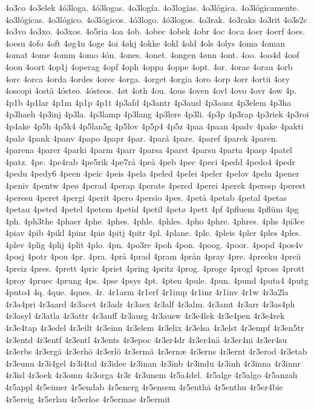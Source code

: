 4o3co
4o3elek
4ó3loga.
4ó3logas.
4o3logía.
4o3logías.
4o3lógica.
4o3lógicamente.
4o3lógicas.
4o3lógico.
4o3lógicos.
4ó3logo.
4ó3logos.
4o3rak.
4o3raks
4o3rit
4o3s2c
4o3vo
4o3xo.
4o3xos.
4o5ria
4oa
4ob.
4obec
4obek
4obr
4oc
4oca
4oer
4oerf
4oes.
4oesu
4ofo
4oft
4øg4u
4oge
4oi
4økj
4okke
4okl
4old
4ols
4olys
4oma
4oman
4omat
4ome
4omm
4omo
4ón.
4ones.
4onet.
4ongen
4ønn
4ont.
4oo.
4oo4d
4oof
4oon
4oort
4op1j
4operag
4opf
4oph
4oppa
4oppe
4opt.
4or.
4orae
4orau
4orb
4orc
4orca
4orda
4ordes
4orec
4orga.
4orget
4orgia
4oro
4orp
4orr
4ortü
4ory
4oscopi
4ostä
4ósteo.
4ósteos.
4øt
4oth
4ou.
4ous
4oven
4ovl
4ovo
4ovr
4ow
4p.
4p1b
4p1lar
4p1m
4p1p
4p1t
4p3afd
4p3antr
4p3ausl
4p3ausz
4p3elem
4p3ha
4p3haeh
4p3inj
4p3la.
4p3lamp
4p3lang
4p3lere
4p3li.
4p3p
4p3rap
4p3riek
4p3roi
4p4ake
4p5h
4p5k4
4p5lan5g
4p5lov
4p5p4
4p5z
4paa
4paan
4padv
4pake
4pakti
4palø
4pank
4panv
4papo
4papr
4par.
4parå
4pare.
4paref
4parek
4paren.
4parena
4parer
4parki
4parm
4parr
4parsa
4parst
4parsu
4parta
4pasp
4patel
4patz.
4pe.
4pe4rab
4pe5rik
4pe7rå
4peå
4peb
4pec
4peci
4pedd
4pedo4
4pedr
4pedu
4pedy6
4peen
4peic
4peis
4pela
4peled
4pelei
4peler
4pelov
4pelu
4pener
4peniv
4pentw
4peø
4perad
4perap
4perate
4pered
4perei
4perek
4peresp
4perest
4peresu
4peret
4pergi
4perit
4pero
4persio
4pes.
4petå
4petab
4petal
4petas
4petau
4peted
4petel
4petem
4petid
4petil
4petø
4pett
4pf
4pfluem
4pflüm
4pg
4ph.
4ph3the
4phaer
4phe.
4phes.
4phle.
4phles.
4pho
4phre.
4phres.
4phs
4pi3ce
4piav
4pib
4pikl
4pinr
4piø
4pitj
4pitr
4pl.
4plane.
4ple.
4pleis
4pler
4ples
4ples.
4plev
4plig
4plij
4plit
4plo.
4pn.
4po3re
4poh
4pon.
4poog.
4poor.
4popd
4pos4v
4posj
4potr
4pou
4pr.
4pra.
4prå
4prad
4pram
4prán
4pray
4pre.
4preeku
4preii
4preiz
4pres.
4prett
4pric
4priet
4pring
4pritz
4prog.
4proge
4progl
4pross
4prott
4proy
4pruec
4prung
4ps.
4pse
4psys
4pt.
4pten
4pule.
4pun.
4pund
4puta4
4putg
4puto4
4q.
4que.
4ques.
4r.
4r1arm
4r1erf
4r1imp
4r1inr
4r1inv
4r1w
4r3a2la
4r3a4pri
4r3aard
4r3acet
4r3adr
4r3aex
4r3alf
4r3alm.
4r3amt
4r3arr
4r3as4ph
4r3asyl
4r3atla
4r3attr
4r3auff
4r3ausg
4r3ausw
4r3e4lek
4r3e4pen
4r3e4rek
4r3e4tap
4r3edel
4r3eilt
4r3einn
4r3elem
4r3elix
4r3elsa
4r3elst
4r3empf
4r3en5tr
4r3entd
4r3entf
4r3entl
4r3ents
4r3epoc
4r3er4dr
4r3er4nä
4r3er4ni
4r3er4su
4r3erbs
4r3ergä
4r3erhö
4r3erlö
4r3ermä
4r3ernæ
4r3erns
4r3ernt
4r3erod
4r3etab
4r3eunu
4r3i4gel
4r3i4tal
4r3idee
4r3inan
4r3inb
4r3indu
4r3inh
4r3inna
4r3innr
4r3isl
4r3oek
4r3omn
4r3orga
4r3r
4r3unem
4r5a4del.
4r5alge
4r5algo
4r5anzah
4r5appl
4r5eimer
4r5endab
4r5energ
4r5ensem
4r5enthä
4r5enthu
4r5er4bie
4r5ereig
4r5erlau
4r5erloe
4r5ermae
4r5ermit
